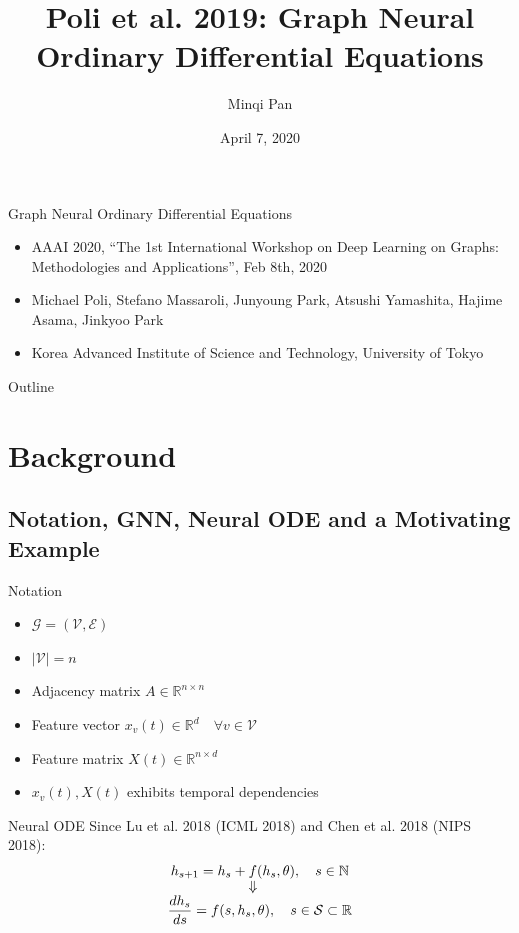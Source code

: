 \documentclass{beamer}
\title{Poli et al. 2019: Graph Neural Ordinary Differential Equations}
\author{Minqi Pan}
\date{April 7, 2020}
\begin{document}
\begin{frame}
  \titlepage
\end{frame}

\begin{frame}{Graph Neural Ordinary Differential Equations}
\begin{itemize}
\item AAAI 2020, ``The 1st International Workshop on Deep Learning on Graphs: Methodologies and Applications'', Feb 8th, 2020
\item Michael Poli, Stefano Massaroli, Junyoung Park, Atsushi Yamashita, Hajime Asama, Jinkyoo Park
\item Korea Advanced Institute of Science and Technology, University of Tokyo
\end{itemize}
\end{frame}

\begin{frame}{Outline}
  \tableofcontents
\end{frame}

\section{Background}
\subsection{Notation, GNN, Neural ODE and a Motivating Example}
\begin{frame}{Notation}
\begin{itemize}
\item $\mathcal G=(\mathcal V,\mathcal E)$
\item $|\mathcal V|=n$
\item Adjacency matrix $A\in\mathbb{R}^{n\times n}$
\item Feature vector $x_v(t)\in\mathbb{R}^d\quad\forall v\in\mathcal V$
\item Feature matrix $X(t)\in\mathbb{R}^{n\times d}$
\item $x_v(t),X(t)$ exhibits temporal dependencies
\end{itemize}
\end{frame}

\begin{frame}{Neural ODE}
Since Lu et al. 2018 (ICML 2018) and Chen et al. 2018 (NIPS 2018):
\begin{gather*}
h_{s+1}=h_s+f(h_s,\theta),\quad s\in\mathbb{N}\\
\ArrowBetweenLines[\Downarrow]
\frac{dh_s}{ds}=f(s,h_s,\theta),\quad s\in\mathcal{S}\subset\mathbb{R}
\end{gather*}
\end{frame}
\end{document}
